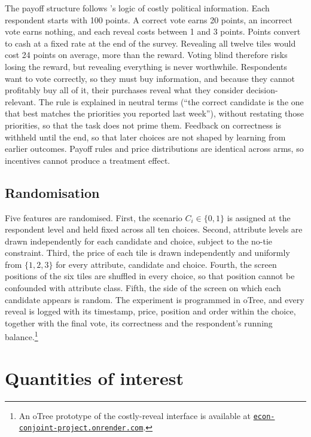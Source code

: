 \documentclass[11pt]{article}
\begin{document}
The payoff structure follows \textcite{Downs1957}'s logic of costly political information. Each respondent starts with 100 points. A correct vote earns 20 points, an incorrect vote earns nothing, and each reveal costs between 1 and 3 points. Points convert to cash at a fixed rate at the end of the survey. Revealing all twelve tiles would cost 24 points on average, more than the reward. Voting blind therefore risks losing the reward, but revealing everything is never worthwhile. Respondents want to vote correctly, so they must buy information, and because they cannot profitably buy all of it, their purchases reveal what they consider decision-relevant. The rule is explained in neutral terms (``the correct candidate is the one that best matches the priorities you reported last week''), without restating those priorities, so that the task does not prime them. Feedback on correctness is withheld until the end, so that later choices are not shaped by learning from earlier outcomes. Payoff rules and price distributions are identical across arms, so incentives cannot produce a treatment effect.

\subsection{Randomisation}

Five features are randomised. First, the scenario $C_i\in\{0,1\}$ is assigned at the respondent level and held fixed across all ten choices. Second, attribute levels are drawn independently for each candidate and choice, subject to the no-tie constraint. Third, the price of each tile is drawn independently and uniformly from $\{1,2,3\}$ for every attribute, candidate and choice. Fourth, the screen positions of the six tiles are shuffled in every choice, so that position cannot be confounded with attribute class. Fifth, the side of the screen on which each candidate appears is random. The experiment is programmed in oTree, and every reveal is logged with its timestamp, price, position and order within the choice, together with the final vote, its correctness and the respondent's running balance.\footnote{An oTree prototype of the costly-reveal interface is available at \href{https://econ-conjoint-project.onrender.com/}{\texttt{econ-conjoint-project.onrender.com}}.}

\section{Quantities of interest}\label{sec:qoi}
\end{document}
